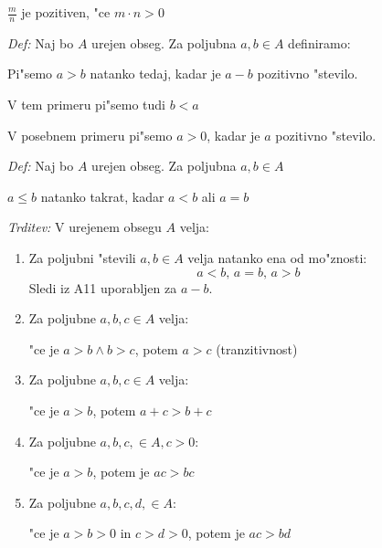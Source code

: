 \(\frac{m}{n}\) je pozitiven, "ce \(m \cdot n > 0\)

\emph{Def:} Naj bo \(A\) urejen obseg. Za poljubna \(a, b \in A\) definiramo:

\hspace*{12pt}Pi"semo \(a > b\) natanko tedaj, kadar je \(a - b\) pozitivno "stevilo.

\hspace*{12pt}V tem primeru pi"semo tudi \(b < a\)

\hspace*{12pt}V posebnem primeru pi"semo \(a > 0\), kadar je \(a\) pozitivno "stevilo.

\emph{Def:} Naj bo \(A\) urejen obseg. Za poljubna \(a, b \in A\)

\hspace*{12pt}\(a \leq b\) natanko takrat, kadar \(a < b\) ali \(a = b\)

\emph{Trditev:} V urejenem obsegu \(A\) velja:
\begin{enumerate}[(1)]
	\item Za poljubni "stevili \(a, b \in A\) velja natanko ena od mo"znosti:
	\[a < b \text{, } a = b \text{, } a > b\]
	Sledi iz A11 uporabljen za \(a - b\).
	
	\item Za poljubne \(a, b, c \in A\) velja:
	
	"ce je \(a > b \land b > c\), potem \(a > c\) (tranzitivnost)
	\item Za poljubne \(a, b, c \in A\) velja:
	
	"ce je \(a > b\), potem \(a + c > b + c\)
	\item Za poljubne \(a, b, c, \in A, c > 0\):
	
	"ce je \(a > b\), potem je \(ac > bc\)
	\item Za poljubne \(a, b, c, d, \in A\):
	
	"ce je \(a > b > 0\) in \(c > d > 0\), potem je \(ac > bd\)
\end{enumerate}

